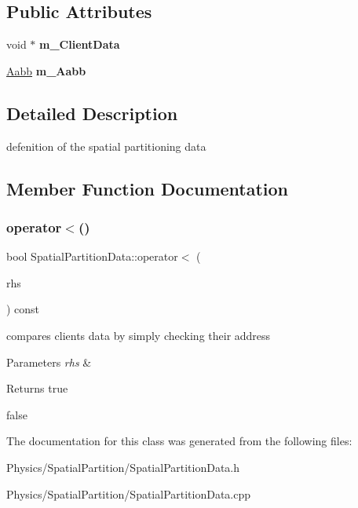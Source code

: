 \subsection*{Public Attributes}
\begin{DoxyCompactItemize}
\item 
\mbox{\label{classSpatialPartitionData_a384e22a7c27282607481fe65f337de3c}} 
void $\ast$ {\bfseries m\+\_\+\+Client\+Data}
\item 
\mbox{\label{classSpatialPartitionData_a4961e1a375165bf9ef6b771277ad79d2}} 
\hyperlink{classAabb}{Aabb} {\bfseries m\+\_\+\+Aabb}
\end{DoxyCompactItemize}


\subsection{Detailed Description}
defenition of the spatial partitioning data 

\subsection{Member Function Documentation}
\mbox{\label{classSpatialPartitionData_adcebf770064b351b8db5e5d792059a0e}} 
\subsubsection{\texorpdfstring{operator$<$()}{operator<()}}
{\footnotesize\ttfamily bool Spatial\+Partition\+Data\+::operator$<$ (\begin{DoxyParamCaption}\item[{const \hyperlink{classSpatialPartitionData}{Spatial\+Partition\+Data} \&}]{rhs }\end{DoxyParamCaption}) const}



compares clients data by simply checking their address 


\begin{DoxyParams}{Parameters}
{\em rhs} & \\
\hline
\end{DoxyParams}
\begin{DoxyReturn}{Returns}
true 

false 
\end{DoxyReturn}


The documentation for this class was generated from the following files\+:\begin{DoxyCompactItemize}
\item 
Physics/\+Spatial\+Partition/Spatial\+Partition\+Data.\+h\item 
Physics/\+Spatial\+Partition/Spatial\+Partition\+Data.\+cpp\end{DoxyCompactItemize}
